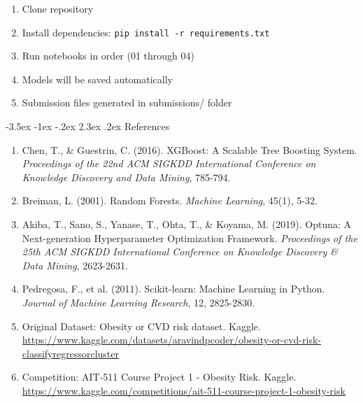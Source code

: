 \documentclass[12pt,a4paper]{article}
\makeatletter
\renewcommand{\section}{\@startsection{section}{1}{\z@}%
                                   {-3.5ex \@plus -1ex \@minus -.2ex}%
                                   {2.3ex \@plus .2ex}%
                                   {\normalfont\Large\bfseries\vspace{0.5\baselineskip}}}
\makeatother
\begin{document}
\begin{enumerate}
    \item Clone repository
    \item Install dependencies: \texttt{pip install -r requirements.txt}
    \item Run notebooks in order (01 through 04)
    \item Models will be saved automatically
    \item Submission files generated in submissions/ folder
\end{enumerate}

\newpage

\section{References}

\begin{enumerate}
    \item Chen, T., \& Guestrin, C. (2016). XGBoost: A Scalable Tree Boosting System. \textit{Proceedings of the 22nd ACM SIGKDD International Conference on Knowledge Discovery and Data Mining}, 785-794.
    
    \item Breiman, L. (2001). Random Forests. \textit{Machine Learning}, 45(1), 5-32.
    
    \item Akiba, T., Sano, S., Yanase, T., Ohta, T., \& Koyama, M. (2019). Optuna: A Next-generation Hyperparameter Optimization Framework. \textit{Proceedings of the 25th ACM SIGKDD International Conference on Knowledge Discovery \& Data Mining}, 2623-2631.
    
    \item Pedregosa, F., et al. (2011). Scikit-learn: Machine Learning in Python. \textit{Journal of Machine Learning Research}, 12, 2825-2830.
    
    \item Original Dataset: Obesity or CVD risk dataset. Kaggle. \url{https://www.kaggle.com/datasets/aravindpcoder/obesity-or-cvd-risk-classifyregressorcluster}
    
    \item Competition: AIT-511 Course Project 1 - Obesity Risk. Kaggle. \url{https://www.kaggle.com/competitions/ait-511-course-project-1-obesity-risk}
\end{enumerate}
\end{document}
